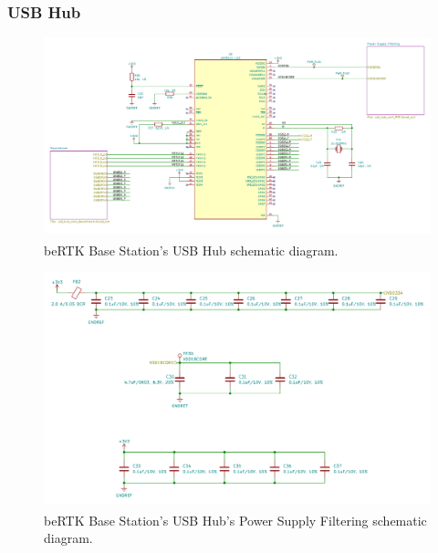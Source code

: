 \subsubsection{USB Hub}\label{sec:3233_LAN9514}

\begin{figure}[h]
	\centering
	\includegraphics[width=1.0\textwidth]{Chapters/Figures/chapter3/USB_Hub_1.pdf}
	\caption{beRTK\textsuperscript{\textregistered} Base Station's USB Hub schematic diagram.}
	\label{fig:USB_Hub_1_circuit}
\end{figure}

\begin{figure}[h]
	\centering
	\includegraphics[width=1.0\textwidth]{Chapters/Figures/chapter3/USB_Hub_PwrSplyFiltering.pdf}
	\caption{beRTK\textsuperscript{\textregistered} Base Station's USB Hub's Power Supply Filtering schematic diagram.}
	\label{fig:USB_Hub_PwrSplyFiltering_circuit}
\end{figure}

